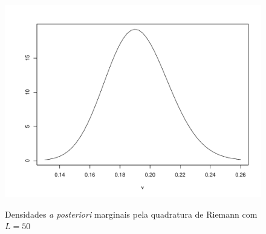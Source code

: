 \begin{figure}[t]
{{			\includegraphics[scale=0.4]{figuras/dpm_nu_qr_50.pdf}}}%
	\caption{Densidades \textit{a posteriori} marginais pela quadratura de Riemann com $L = 50$}%
\end{figure}

